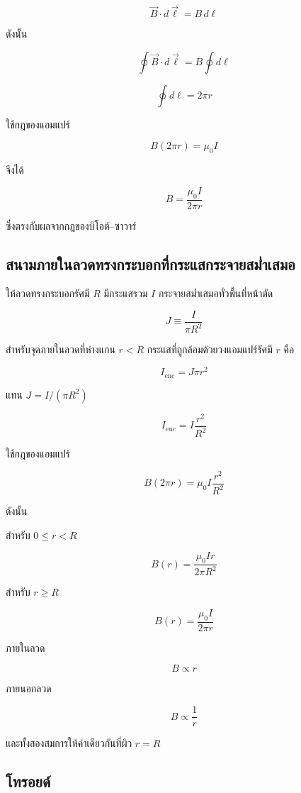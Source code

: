 \[
\vec{B}\cdot d\vec{\ell}=B\,d\ell
\]

ดังนั้น

\[
\oint\vec{B}\cdot d\vec{\ell}
=
B\oint d\ell
\]

\[
\oint d\ell=2\pi r
\]

ใช้กฎของแอมแปร์

\[
B(2\pi r)=\mu_0I
\]

จึงได้

\[
\boxed{B=\frac{\mu_0I}{2\pi r}}
\]

ซึ่งตรงกับผลจากกฎของบิโอต์--ซาวาร์

\subsection{สนามภายในลวดทรงกระบอกที่กระแสกระจายสม่ำเสมอ}

ให้ลวดทรงกระบอกรัศมี $R$ มีกระแสรวม $I$ กระจายสม่ำเสมอทั่วพื้นที่หน้าตัด

\begin{tcolorbox}[title={นิยาม: ความหนาแน่นกระแสสม่ำเสมอ}]
\[
\boxed{J\equiv\frac{I}{\pi R^2}}
\]
\end{tcolorbox}

สำหรับจุดภายในลวดที่ห่างแกน $r<R$ กระแสที่ถูกล้อมด้วยวงแอมแปร์รัศมี $r$ คือ

\[
I_{\text{enc}}
=J\pi r^2
\]

แทน $J=I/(\pi R^2)$

\[
I_{\text{enc}}
=
I\frac{r^2}{R^2}
\]

ใช้กฎของแอมแปร์

\[
B(2\pi r)
=
\mu_0I\frac{r^2}{R^2}
\]

ดังนั้น

\begin{tcolorbox}[title={สนามภายในและภายนอกลวดทรงกระบอก}]
สำหรับ $0\le r<R$

\[
\boxed{
B(r)=\frac{\mu_0Ir}{2\pi R^2}}
\]

สำหรับ $r\ge R$

\[
\boxed{
B(r)=\frac{\mu_0I}{2\pi r}}
\]
\end{tcolorbox}

ภายในลวด

\[
B\propto r
\]

ภายนอกลวด

\[
B\propto\frac{1}{r}
\]

และทั้งสองสมการให้ค่าเดียวกันที่ผิว $r=R$

\subsection{โทรอยด์}

